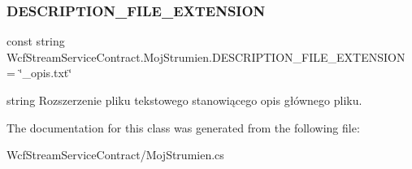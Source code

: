 \subsubsection{\texorpdfstring{D\+E\+S\+C\+R\+I\+P\+T\+I\+O\+N\+\_\+\+F\+I\+L\+E\+\_\+\+E\+X\+T\+E\+N\+S\+I\+ON}{DESCRIPTION\_FILE\_EXTENSION}}
{\footnotesize\ttfamily const string Wcf\+Stream\+Service\+Contract.\+Moj\+Strumien.\+D\+E\+S\+C\+R\+I\+P\+T\+I\+O\+N\+\_\+\+F\+I\+L\+E\+\_\+\+E\+X\+T\+E\+N\+S\+I\+ON = \char`\"{}\+\_\+opis.\+txt\char`\"{}\hspace{0.3cm}{\ttfamily [private]}}



string Rozszerzenie pliku tekstowego stanowiącego opis głównego pliku. 



The documentation for this class was generated from the following file\+:\begin{DoxyCompactItemize}
\item 
Wcf\+Stream\+Service\+Contract/Moj\+Strumien.\+cs\end{DoxyCompactItemize}

